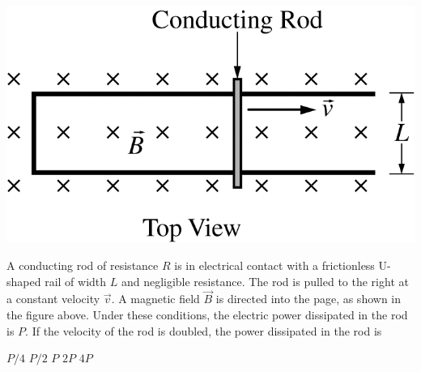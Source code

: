 
\begin{center}
    \includegraphics[scale=0.3]{images/img-007-014.png}
\end{center}

\begin{questions}
\setcounter{question}{11}

\question
A conducting rod of resistance $R$ is in electrical contact with a frictionless U-shaped rail of width $L$ and negligible resistance. The rod is pulled to the right at a constant velocity $\vec{v}$. A magnetic field $\vec{B}$ is directed into the page, as shown in the figure above. Under these conditions, the electric power dissipated in the rod is $P$. If the velocity of the rod is doubled, the power dissipated in the rod is

\begin{oneparchoices}
    \choice $P / 4$
    \choice $P / 2$
    \choice $P$
    \choice $2P$
    \choice $4P$
\end{oneparchoices}
\end{questions}
